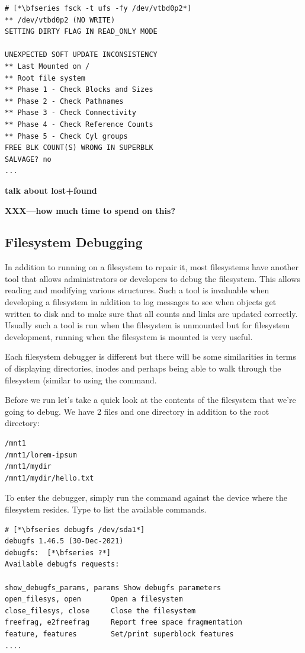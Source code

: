 \begin{lstlisting}
# [*\bfseries fsck -t ufs -fy /dev/vtbd0p2*]
** /dev/vtbd0p2 (NO WRITE)
SETTING DIRTY FLAG IN READ_ONLY MODE

UNEXPECTED SOFT UPDATE INCONSISTENCY
** Last Mounted on /
** Root file system
** Phase 1 - Check Blocks and Sizes
** Phase 2 - Check Pathnames
** Phase 3 - Check Connectivity
** Phase 4 - Check Reference Counts
** Phase 5 - Check Cyl groups
FREE BLK COUNT(S) WRONG IN SUPERBLK
SALVAGE? no
...
\end{lstlisting}

\noindent
\textbf{talk about lost+found}

\textbf{XXX---how much time to spend on this?}

\subsection{Filesystem Debugging}

In addition to running  on a filesystem to repair it, most filesystems have another tool that allows administrators or developers to debug the filesystem. This allows reading and modifying various structures. Such a tool is invaluable when developing a filesystem in addition to log messages to see when objects get written to disk and to make sure that all counts and links are updated correctly. Usually such a tool is run when the filesystem is unmounted but for filesystem development, running when the filesystem is mounted is very useful. 

Each filesystem debugger is different but there will be some similarities in terms of displaying directories, inodes and perhaps being able to walk through the filesystem (similar to using the  command.

Before we run  let's take a quick look at the contents of the filesystem that we're going to debug. We have 2 files and one directory in addition to the root directory:

\begin{lstlisting}
/mnt1
/mnt1/lorem-ipsum
/mnt1/mydir
/mnt1/mydir/hello.txt
\end{lstlisting}

\noindent
To enter the debugger, simply run the command against the device where the filesystem resides. Type  to list the available commands.

\begin{lstlisting}
# [*\bfseries debugfs /dev/sda1*]
debugfs 1.46.5 (30-Dec-2021)
debugfs:  [*\bfseries ?*]
Available debugfs requests:

show_debugfs_params, params Show debugfs parameters
open_filesys, open       Open a filesystem
close_filesys, close     Close the filesystem
freefrag, e2freefrag     Report free space fragmentation
feature, features        Set/print superblock features
....
\end{lstlisting}

